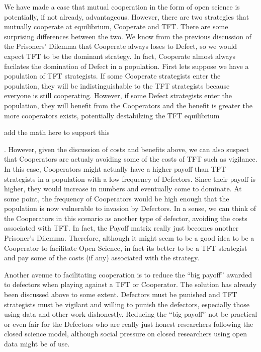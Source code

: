 \documentclass[11pt]{article} %
\begin{document}
We have made a case that mutual cooperation in the form of open science is potentially, if not already, advantageous. However, there are two strategies that mutually cooperate at equilibrium, Cooperate and TFT. There are some surprising differences between the two. We know from the previous discussion of the Prisoners' Dilemma that Cooperate always loses to Defect, so we would expect TFT to be the dominant strategy. In fact, Cooperate almost always facilates the domination of Defect in a population.  First lets suppose we have a population of TFT strategists. If some Cooperate strategists enter the population, they will be indistinguishable to the TFT strategists because everyone is still cooperating. However, if some Defect strategists enter the population, they will benefit from the Cooperators and the benefit is greater the more cooperators exists, potentially destabilzing the TFT equilibrium \begin{em} add the math here to support this \end{em}. However, given the discussion of costs and benefits above, we can also suspect that Cooperators are actualy avoiding some of the costs of TFT such as vigilance. In this case, Cooperators might actually have a higher payoff than TFT strategists in a population with a low frequency of Defectors. Since their payoff is higher, they would increase in numbers and eventually come to dominate. At some point, the frequency of Cooperators would be high enough that the population is now vulnerable to invasion by Defectors. In a sense, we can think of the Cooperators in this scenario as another type of defector, avoiding the costs associated with TFT. In fact, the Payoff matrix really just becomes another Prisoner's Dilemma. Therefore, although it might seem to be a good idea to be a Cooperator to facilitate Open Science, in fact its better to be a TFT strategist and pay some of the costs (if any) associated with the strategy.

Another avenue to facilitating cooperation is to reduce the ``big payoff'' awarded to defectors when playing against a TFT or Cooperator. The solution has already been discussed above to some extent. Defectors must be punished and TFT strategists must be vigilant and willing to punish the defectors, especially those using data and other work dishonestly. Reducing the ``big payoff'' not be practical or even fair for the Defectors who are really just honest researchers following the closed science model, although social pressure on closed researchers using open data might be of use.
\end{document}
